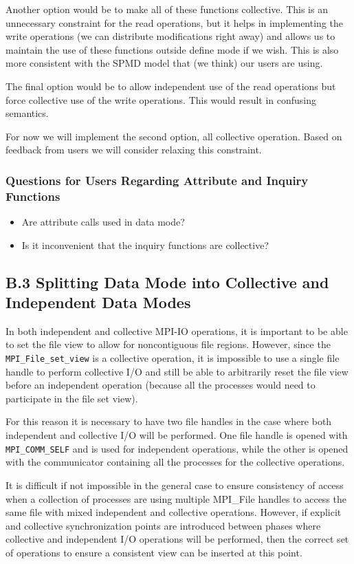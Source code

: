 \documentclass[10pt]{article}
\begin{document}
Another option would be to make all of these functions collective.  This is an
unnecessary constraint for the read operations, but it helps in implementing
the write operations (we can distribute modifications right away) and allows
us to maintain the use of these functions outside define mode if we wish.
This is also more consistent with the SPMD model that (we think) our users are
using.

The final option would be to allow independent use of the read operations but
force collective use of the write operations.  This would result in confusing
semantics.

For now we will implement the second option, all collective operation.  Based
on feedback from users we will consider relaxing this constraint.

\subsubsection*{Questions for Users Regarding Attribute and Inquiry Functions}
\begin{itemize}
\item Are attribute calls used in data mode?
\item Is it inconvenient that the inquiry functions are collective?
\end{itemize}

\subsection*{B.3  Splitting Data Mode into Collective and Independent Data Modes}

In both independent and collective MPI-IO operations, it is important to be
able to set the file view to allow for noncontiguous file regions.  However,
since the \texttt{MPI\_File\_set\_view} is a collective operation, it is
impossible to use a single file handle to perform collective I/O and still be
able to arbitrarily reset the file view before an independent operation
(because all the processes would need to participate in the file set view).

For this reason it is necessary to have two file handles in the case where
both independent and collective I/O will be performed.  One file handle is
opened with \texttt{MPI\_COMM\_SELF} and is used for independent operations,
while the other is opened with the communicator containing all the processes
for the collective operations.

It is difficult if not impossible in the general case to ensure consistency of
access when a collection of processes are using multiple MPI\_File handles to
access the same file with mixed independent and collective operations.
However, if explicit and collective synchronization points are introduced
between phases where collective and independent I/O operations will be
performed, then the correct set of operations to ensure a consistent view can
be inserted at this point.
\end{document}
